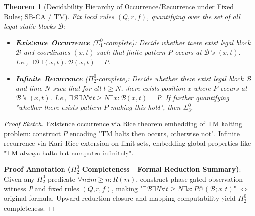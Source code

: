 \documentclass[12pt]{article}
\theoremstyle{plain}
\newtheorem{theorem}{Theorem}[section]
\theoremstyle{definition}
\begin{document}
\begin{theorem}[Decidability Hierarchy of Occurrence/Recurrence under Fixed Rules; SB-CA / TM]
Fix local rules $(Q, r, f)$, quantifying over the set of all legal static blocks $\mathcal{B}$:

\begin{itemize}
\item \textbf{Existence Occurrence} ($\Sigma_1^0$-complete): Decide whether there exist legal block $\mathcal{B}$ and coordinates $(x,t)$ such that finite pattern $P$ occurs at $\mathcal{B}$'s $(x,t)$. I.e., $\exists \mathcal{B} \exists (x,t): \mathcal{B}(x,t) = P$.
\item \textbf{Infinite Recurrence} ($\Pi_2^0$-complete): Decide whether there exist legal block $\mathcal{B}$ and time $N$ such that for all $t \ge N$, there exists position $x$ where $P$ occurs at $\mathcal{B}$'s $(x,t)$. I.e., $\exists \mathcal{B} \exists N \forall t \ge N \exists x: \mathcal{B}(x,t) = P$. If further quantifying "whether there exists pattern $P$ making this hold", then $\Sigma_3^0$.
\end{itemize}
\end{theorem}

\begin{proof}[Proof Sketch]
Existence occurrence via Rice theorem embedding of TM halting problem: construct $P$ encoding "TM halts then occurs, otherwise not". Infinite recurrence via Kari--Rice extension\cite{kari1994} on limit sets, embedding global properties like "TM always halts but computes infinitely".

\textbf{Proof Annotation ($\Pi_2^0$ Completeness---Formal Reduction Summary)}: Given any $\Pi_2^0$ predicate $\forall n \exists m \ge n: R(m)$, construct phase-gated observation witness $P$ and fixed rules $(Q,r,f)$, making "$\exists \mathcal{B} \exists N \forall t \ge N \exists x: P@(\mathcal{B};x,t)$" $\Leftrightarrow$ original formula. Upward reduction closure and mapping computability yield $\Pi_2^0$-completeness.
\end{proof}
\end{document}
